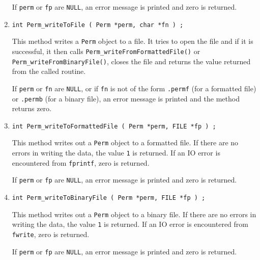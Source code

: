 \begin{enumerate}
If {\tt perm} or {\tt fp} are {\tt NULL},
an error message is printed and zero is returned.
\item
\begin{verbatim}
int Perm_writeToFile ( Perm *perm, char *fn ) ;
\end{verbatim}
\par
This method writes a {\tt Perm} object to a file.
It tries to open the file and if it is successful, 
it then calls {\tt Perm\_writeFromFormattedFile()} or
{\tt Perm\_writeFromBinaryFile()},
closes the file
and returns the value returned from the called routine.
\par {}
If {\tt perm} or {\tt fn} are {\tt NULL}, 
or if {\tt fn} is not of the form
{\tt *.permf} (for a formatted file) 
or {\tt *.permb} (for a binary file),
an error message is printed and the method returns zero.
\item
\begin{verbatim}
int Perm_writeToFormattedFile ( Perm *perm, FILE *fp ) ;
\end{verbatim}
\par
This method writes out a {\tt Perm} object to a formatted file.
If there are no errors in writing the data, 
the value {\tt 1} is returned.
If an IO error is encountered from {\tt fprintf}, zero is returned.
\par {}
If {\tt perm} or {\tt fp} are {\tt NULL},
an error message is printed and zero is returned.
\item
\begin{verbatim}
int Perm_writeToBinaryFile ( Perm *perm, FILE *fp ) ;
\end{verbatim}
\par
This method writes out a {\tt Perm} object to a binary file.
If there are no errors in writing the data, 
the value {\tt 1} is returned.
If an IO error is encountered from {\tt fwrite}, zero is returned.
\par {}
If {\tt perm} or {\tt fp} are {\tt NULL},
an error message is printed and zero is returned.

\end{enumerate}
